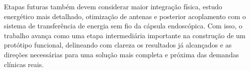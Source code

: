 \documentclass[repeatfields,xlists,xpacks,oneside]{ufrgscca}
\begin{document}
Etapas futuras também devem considerar maior integração física, estudo energético mais detalhado, otimização de antenas e posterior acoplamento com o sistema de transferência de energia sem fio da cápsula endoscópica. Com isso, o trabalho avança como uma etapa intermediária importante na construção de um protótipo funcional, delineando com clareza os resultados já alcançados e as direções necessárias para uma solução mais completa e próxima das demandas clínicas reais.



\printbibliography
\end{document}

